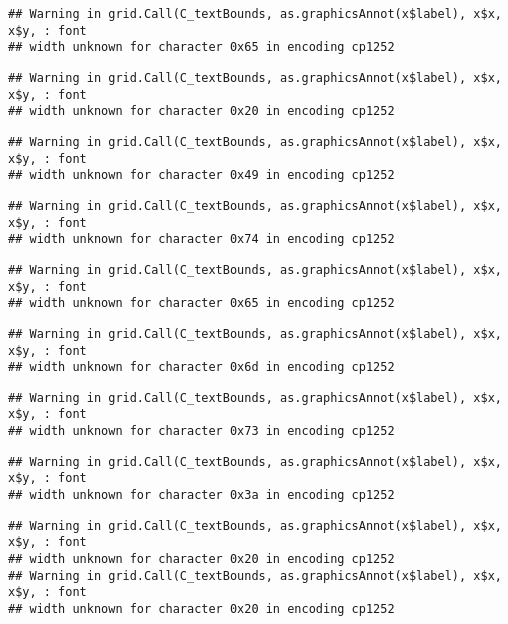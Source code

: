 \documentclass[
]{article}
\begin{document}
\begin{verbatim}
## Warning in grid.Call(C_textBounds, as.graphicsAnnot(x$label), x$x, x$y, : font
## width unknown for character 0x65 in encoding cp1252
\end{verbatim}

\begin{verbatim}
## Warning in grid.Call(C_textBounds, as.graphicsAnnot(x$label), x$x, x$y, : font
## width unknown for character 0x20 in encoding cp1252
\end{verbatim}

\begin{verbatim}
## Warning in grid.Call(C_textBounds, as.graphicsAnnot(x$label), x$x, x$y, : font
## width unknown for character 0x49 in encoding cp1252
\end{verbatim}

\begin{verbatim}
## Warning in grid.Call(C_textBounds, as.graphicsAnnot(x$label), x$x, x$y, : font
## width unknown for character 0x74 in encoding cp1252
\end{verbatim}

\begin{verbatim}
## Warning in grid.Call(C_textBounds, as.graphicsAnnot(x$label), x$x, x$y, : font
## width unknown for character 0x65 in encoding cp1252
\end{verbatim}

\begin{verbatim}
## Warning in grid.Call(C_textBounds, as.graphicsAnnot(x$label), x$x, x$y, : font
## width unknown for character 0x6d in encoding cp1252
\end{verbatim}

\begin{verbatim}
## Warning in grid.Call(C_textBounds, as.graphicsAnnot(x$label), x$x, x$y, : font
## width unknown for character 0x73 in encoding cp1252
\end{verbatim}

\begin{verbatim}
## Warning in grid.Call(C_textBounds, as.graphicsAnnot(x$label), x$x, x$y, : font
## width unknown for character 0x3a in encoding cp1252
\end{verbatim}

\begin{verbatim}
## Warning in grid.Call(C_textBounds, as.graphicsAnnot(x$label), x$x, x$y, : font
## width unknown for character 0x20 in encoding cp1252
## Warning in grid.Call(C_textBounds, as.graphicsAnnot(x$label), x$x, x$y, : font
## width unknown for character 0x20 in encoding cp1252
\end{verbatim}
\end{document}
